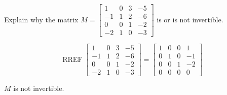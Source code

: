 
\begin{exerciseStatement}


Explain why the matrix \(M= \left[\begin{array}{cccc}
1 & 0 & 3 & -5 \\
-1 & 1 & 2 & -6 \\
0 & 0 & 1 & -2 \\
-2 & 1 & 0 & -3
\end{array}\right] \) is or is not invertible.


\end{exerciseStatement}
    
\begin{exerciseAnswer} 


\[\operatorname{RREF} \left[\begin{array}{cccc}
1 & 0 & 3 & -5 \\
-1 & 1 & 2 & -6 \\
0 & 0 & 1 & -2 \\
-2 & 1 & 0 & -3
\end{array}\right] = \left[\begin{array}{cccc}
1 & 0 & 0 & 1 \\
0 & 1 & 0 & -1 \\
0 & 0 & 1 & -2 \\
0 & 0 & 0 & 0
\end{array}\right] \]

\(M\) is not invertible.
\end{exerciseAnswer}
    
